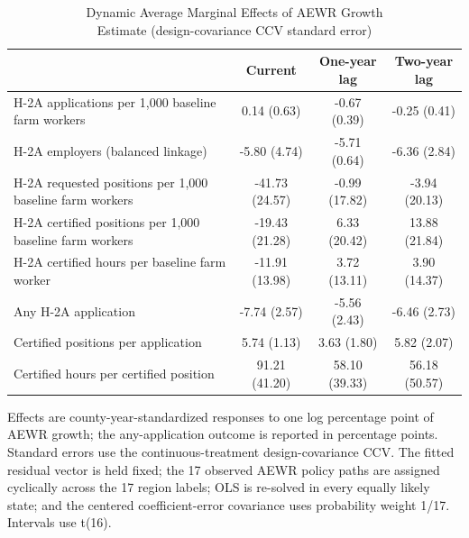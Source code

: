 \begin{table}[!htbp]
\caption*{
{\large Dynamic Average Marginal Effects of AEWR Growth} \\
{\small Estimate (design-covariance CCV standard error)}
} 

\fontsize{10.0pt}{12.0pt}\selectfont

\begin{tabular*}{1.0\linewidth}{@{\extracolsep{\fill}}l|ccc}
\toprule
  & Current & One-year lag & Two-year lag \\ 
\midrule\addlinespace[2.5pt]
H-2A applications per 1,000 baseline farm workers & 0.14 (0.63) & -0.67 (0.39) & -0.25 (0.41) \\
H-2A employers (balanced linkage) & -5.80 (4.74) & -5.71 (0.64) & -6.36 (2.84) \\
H-2A requested positions per 1,000 baseline farm workers & -41.73 (24.57) & -0.99 (17.82) & -3.94 (20.13) \\
H-2A certified positions per 1,000 baseline farm workers & -19.43 (21.28) & 6.33 (20.42) & 13.88 (21.84) \\
H-2A certified hours per baseline farm worker & -11.91 (13.98) & 3.72 (13.11) & 3.90 (14.37) \\
Any H-2A application & -7.74 (2.57) & -5.56 (2.43) & -6.46 (2.73) \\
Certified positions per application & 5.74 (1.13) & 3.63 (1.80) & 5.82 (2.07) \\
Certified hours per certified position & 91.21 (41.20) & 58.10 (39.33) & 56.18 (50.57) \\
\bottomrule
\end{tabular*}
\begin{minipage}{\linewidth}
Effects are county-year-standardized responses to one log percentage point of AEWR growth; the any-application outcome is reported in percentage points. Standard errors use the continuous-treatment design-covariance CCV. The fitted residual vector is held fixed; the 17 observed AEWR policy paths are assigned cyclically across the 17 region labels; OLS is re-solved in every equally likely state; and the centered coefficient-error covariance uses probability weight 1/17. Intervals use t(16).\\
\end{minipage}
\end{table}
